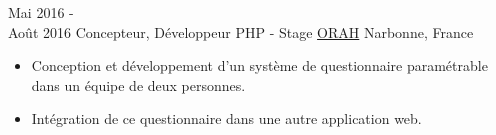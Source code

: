 \documentclass[letterpaper]{twentysecondcv} %
\begin{document}
\begin{twenty}
    \twentyitem
   		{Mai 2016 - \\ Août 2016}
        {Concepteur, Développeur PHP - Stage}
        {\href{https://www.orha.fr/}{ORAH}}
        {Narbonne, France}
        {
        {\begin{itemize}
        \item Conception et développement d'un système de questionnaire paramétrable dans un équipe de deux personnes.
        \item Intégration de ce questionnaire dans une autre application web.
    \end{itemize}}
        }
\end{twenty}
\end{document}
